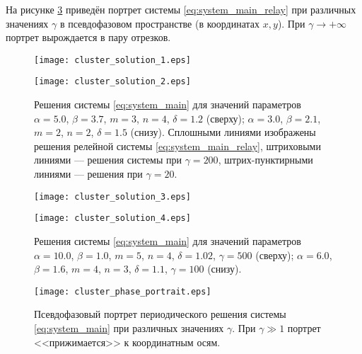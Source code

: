 
На рисунке \ref{fig:phase_portrait} приведён портрет системы \eqref{eq:system_main_relay} при различных значениях $\gamma$ в псевдофазовом пространстве (в координатах $x, y$). При $\gamma \to +\infty$ портрет вырождается в пару отрезков.

\begin{figure}[!htb]
	\centering
	
	\texttt{[image: cluster\_solution\_1.eps]}
	
	\smallskip
	
	\texttt{[image: cluster\_solution\_2.eps]}
	
	\caption{Решения системы \eqref{eq:system_main} для значений параметров $\alpha = 5.0$, $\beta = 3.7$, $m = 3$, $n = 4$, $\delta = 1.2$  (сверху); $\alpha = 3.0$, $\beta = 2.1$, $m = 2$, $n = 2$, $\delta = 1.5$ (снизу). Сплошными линиями изображены решения релейной системы \eqref{eq:system_main_relay}, штриховыми линиями --- решения системы при $\gamma = 200$, штрих-пунктирными линиями --- решения при $\gamma = 20$.
	}
	\label{fig:cluster_solution}
\end{figure}

\begin{figure}[!htb]
	\centering
	\texttt{[image: cluster\_solution\_3.eps]}
	
	\smallskip
	
	\texttt{[image: cluster\_solution\_4.eps]}
	
	\caption{Решения системы \eqref{eq:system_main} для значений параметров $\alpha = 10.0$, $\beta = 1.0$, $m = 5$, $n = 4$, $\delta = 1.02$, $\gamma = 500$ (сверху); $\alpha = 6.0$, $\beta = 1.6$, $m = 4$, $n = 3$, $\delta = 1.1$, $\gamma = 100$ (снизу).}
	\label{fig:cluster_solution2}
\end{figure}

\begin{figure}[!htb]
	\centering
	\texttt{[image: cluster\_phase\_portrait.eps]}
	\caption{Псевдофазовый портрет периодического решения системы \eqref{eq:system_main} при различных значениях $\gamma$. При $\gamma \gg 1$ портрет <<прижимается>> к координатным осям.}
	\label{fig:phase_portrait}
\end{figure} 

